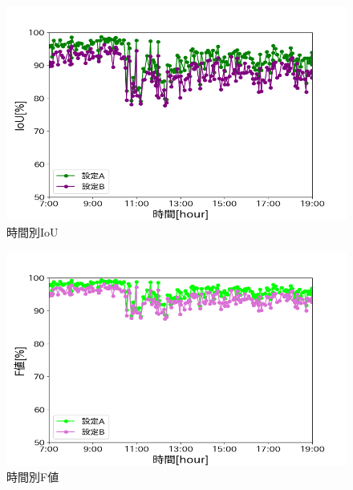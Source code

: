 \begin{figure}[ht] 
  \begin{center}
    \includegraphics[width=\linewidth]{image/0707_AB_IoU.png}
  \end{center}
  \caption{時間別IoU}
  \label{AB_IoU}
\end{figure}

\begin{figure}[ht] 
  \begin{center}
    \includegraphics[width=\linewidth]{image/0707_AB_bf.png}
  \end{center}
  \caption{時間別F値}
  \label{AB_bf}
\end{figure}
\clearpage

